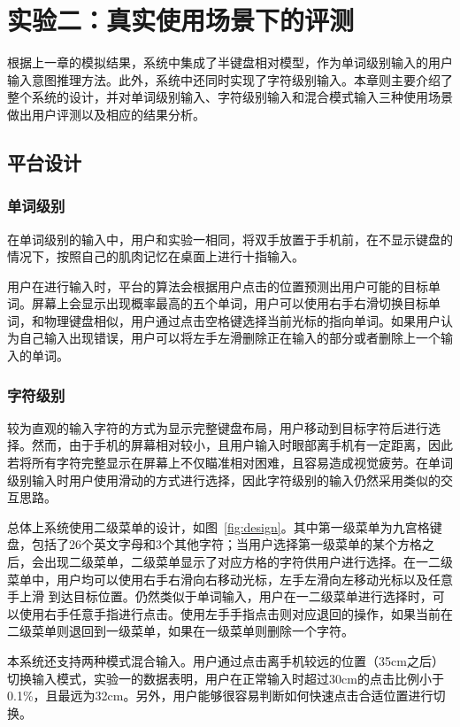 \chapter{实验二：真实使用场景下的评测} %
\label{cha:evaluation}
根据上一章的模拟结果，系统中集成了半键盘相对模型，作为单词级别输入的用户输入意图推理方法。此外，系统中还同时实现了字符级别输入。本章则主要介绍了整个系统的设计，并对单词级别输入、字符级别输入和混合模式输入三种使用场景做出用户评测以及相应的结果分析。

\section{平台设计}
\subsection{单词级别}
在单词级别的输入中，用户和实验一相同，将双手放置于手机前，在不显示键盘的情况下，按照自己的肌肉记忆在桌面上进行十指输入。

用户在进行输入时，平台的算法会根据用户点击的位置预测出用户可能的目标单词。屏幕上会显示出现概率最高的五个单词，用户可以使用右手右滑切换目标单词，和物理键盘相似，用户通过点击空格键选择当前光标的指向单词。如果用户认为自己输入出现错误，用户可以将左手左滑删除正在输入的部分或者删除上一个输入的单词。

\subsection{字符级别}
较为直观的输入字符的方式为显示完整键盘布局，用户移动到目标字符后进行选择。然而，由于手机的屏幕相对较小，且用户输入时眼部离手机有一定距离，因此若将所有字符完整显示在屏幕上不仅瞄准相对困难，且容易造成视觉疲劳。在单词级别输入时用户使用滑动的方式进行选择，因此字符级别的输入仍然采用类似的交互思路。

总体上系统使用二级菜单的设计，如图~\ref{fig:design}。其中第一级菜单为九宫格键盘，包括了26个英文字母和3个其他字符；当用户选择第一级菜单的某个方格之后，会出现二级菜单，二级菜单显示了对应方格的字符供用户进行选择。在一二级菜单中，用户均可以使用右手右滑向右移动光标，左手左滑向左移动光标以及任意手上滑 到达目标位置。仍然类似于单词输入，用户在一二级菜单进行选择时，可以使用右手任意手指进行点击。使用左手手指点击则对应退回的操作，如果当前在二级菜单则退回到一级菜单，如果在一级菜单则删除一个字符。

本系统还支持两种模式混合输入。用户通过点击离手机较远的位置（35cm之后）切换输入模式，实验一的数据表明，用户在正常输入时超过30cm的点击比例小于0.1\%，且最远为32cm。另外，用户能够很容易判断如何快速点击合适位置进行切换。

